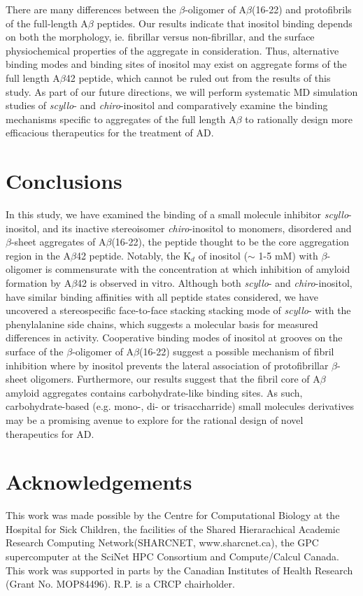 There are many differences between the $\beta$-oligomer of A$\beta$(16-22) and protofibrils of  the full-length A$\beta$ peptides. Our results indicate that inositol binding depends on both the morphology, ie. fibrillar versus non-fibrillar, and the surface physiochemical properties of the aggregate in consideration. Thus, alternative binding modes and binding sites of inositol may exist on aggregate forms of the full length A$\beta$42 peptide, which cannot be ruled out from the results of this study. As part of our future directions, we will perform systematic MD simulation studies of \emph{scyllo}- and \emph{chiro}-inositol and comparatively examine the binding mechanisms specific to aggregates of the full length A$\beta$ to rationally design more efficacious therapeutics for the treatment of AD.


\section{Conclusions} %
\label{sec:conclusions}

In this study, we have examined the binding of a small molecule inhibitor \emph{scyllo}-inositol, and its inactive stereoisomer \emph{chiro}-inositol to monomers, disordered and $\beta$-sheet aggregates of A$\beta$(16-22), the peptide thought to be the core aggregation region in the A$\beta$42 peptide. Notably, the K$_{d}$ of inositol ($\sim$ 1-5 mM) with $\beta$-oligomer is commensurate with the concentration at which inhibition of amyloid formation by A$\beta$42 is observed in vitro. Although both \emph{scyllo}- and \emph{chiro}-inositol, have similar binding affinities with all peptide states considered, we have uncovered a stereospecific face-to-face stacking stacking mode of \emph{scyllo}- with the phenylalanine side chains, which suggests a molecular basis for measured differences in activity.  Cooperative binding modes of inositol at grooves on the surface of the $\beta$-oligomer of A$\beta$(16-22) suggest a possible mechanism of fibril inhibition where by inositol prevents the lateral association of protofibrillar $\beta$-sheet oligomers. Furthermore, our results suggest that the fibril core of A$\beta$ amyloid aggregates contains carbohydrate-like binding sites. As such, carbohydrate-based (e.g. mono-, di- or trisaccharride) small molecules derivatives may be a promising avenue to explore for the rational design of novel therapeutics for AD.

\section*{Acknowledgements}
This work was made possible by the Centre for Computational Biology at the Hospital for Sick Children, the facilities of the Shared Hierarachical Academic Research Computing Network(SHARCNET, www.sharcnet.ca), the GPC supercomputer at the SciNet HPC Consortium and Compute/Calcul Canada. This work was supported in parts by the Canadian Institutes of Health Research (Grant No. MOP84496). R.P. is a CRCP chairholder.

\begin{singlespace}


\end{singlespace}
